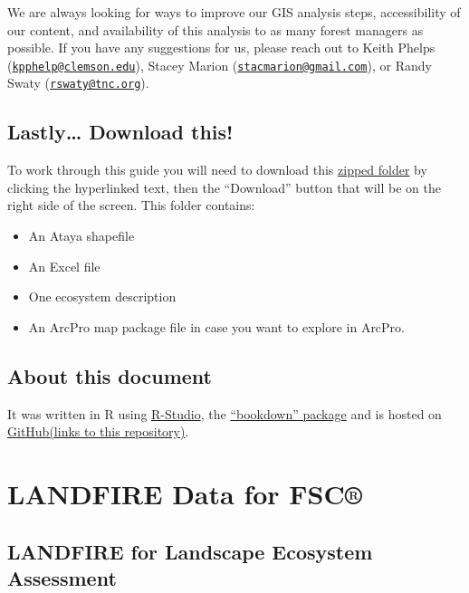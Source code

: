 \documentclass[
]{book}
\providecommand{\tightlist}{%
  \setlength{\itemsep}{0pt}\setlength{\parskip}{0pt}}
\begin{document}
We are always looking for ways to improve our GIS analysis steps, accessibility of our content, and availability of this analysis to as many forest managers as possible. If you have any suggestions for us, please reach out to Keith Phelps (\href{mailto:kpphelp@clemson.edu}{\nolinkurl{kpphelp@clemson.edu}}), Stacey Marion (\href{mailto:stacmarion@gmail.com}{\nolinkurl{stacmarion@gmail.com}}), or Randy Swaty (\href{mailto:rswaty@tnc.org}{\nolinkurl{rswaty@tnc.org}}).

\hypertarget{lastly-download-this}{%
\section{Lastly\ldots{} Download this!}\label{lastly-download-this}}

To work through this guide you will need to download this \href{https://github.com/rswaty/landfireFSC/blob/main/toDownload.zip}{zipped folder} by clicking the hyperlinked text, then the ``Download'' button that will be on the right side of the screen. This folder contains:

\begin{itemize}
\tightlist
\item
  An Ataya shapefile
\item
  An Excel file
\item
  One ecosystem description
\item
  An ArcPro map package file in case you want to explore in ArcPro.
\end{itemize}

\hypertarget{about-this-document}{%
\section{About this document}\label{about-this-document}}

It was written in R using \href{https://rstudio.com/}{R-Studio}, the \href{https://www.bookdown.org/}{``bookdown'' package} and is hosted on \href{https://github.com/rswaty/landfireFSC}{GitHub(links to this repository)}.

\hypertarget{inputdata}{%
\chapter{LANDFIRE Data for FSC®}\label{inputdata}}

\hypertarget{landfire-for-landscape-ecosystem-assessment}{%
\section{LANDFIRE for Landscape Ecosystem Assessment}\label{landfire-for-landscape-ecosystem-assessment}}
\end{document}
